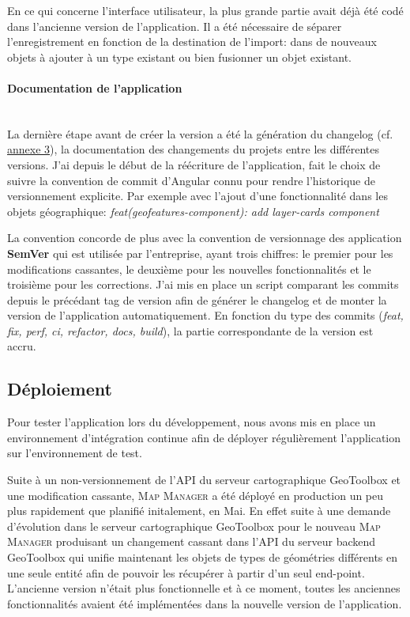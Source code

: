 \documentclass{rapportUHA40}
\begin{document}
En ce qui concerne l'interface utilisateur, la plus grande partie avait déjà
été codé dans l'ancienne version de l'application. Il a été nécessaire de
séparer l'enregistrement en fonction de la destination de l'import: dans de
nouveaux objets à ajouter à un type existant ou bien fusionner un objet
existant. \\

\paragraph{Documentation de l'application}\mbox{}\\
La dernière étape avant de créer la version a été la génération du changelog
(cf. \hyperlink{ANNEX3}{annexe 3}), la documentation des changements du projets
entre les différentes versions. J'ai depuis le début de la réécriture de
l'application, fait le choix de suivre la convention de commit d'Angular connu
pour rendre l'historique de versionnement explicite. Par exemple avec l'ajout d'une
fonctionnalité dans les objets géographique: \textit{feat(geofeatures-component): add layer-cards component}

La convention concorde de plus avec la convention de versionnage des
application \textbf{SemVer} qui est utilisée par l'entreprise, ayant trois
chiffres: le premier pour les modifications cassantes, le deuxième pour les
nouvelles fonctionnalités et le troisième pour les corrections. J'ai mis en
place un script comparant les commits depuis le précédant tag de version afin
de générer le changelog et de monter la version de l'application
automatiquement. En fonction du type des commits (\textit{feat, fix, perf, ci,
  refactor, docs, build}), la partie correspondante de la version est accru.

\subsection{Déploiement}
Pour tester l'application lors du développement, nous avons mis en place un
environnement d'intégration continue afin de déployer régulièrement
l'application sur l'environnement de test.

Suite à un non-versionnement de l'API du serveur cartographique GeoToolbox et
une modification cassante, \textsc{Map Manager} a été déployé en production un
peu plus rapidement que planifié initalement, en Mai. En effet suite à une
demande d'évolution dans le serveur cartographique GeoToolbox pour le nouveau
\textsc{Map Manager} produisant un changement cassant dans l'API du serveur
backend GeoToolbox qui unifie maintenant les objets de types de géométries
différents en une seule entité afin de pouvoir les récupérer à partir d'un seul
end-point. L'ancienne version n'était plus fonctionnelle et à ce moment, toutes
les anciennes fonctionnalités avaient été implémentées dans la nouvelle version
de l'application.
\end{document}
